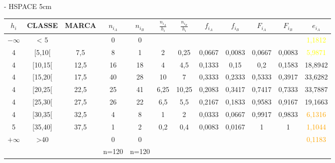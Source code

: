 \vspace{1cm}
\hspace*{5cm} - HSPACE 5cm
\newline
\vspace{1cm}
\newline
\begin{minipage}{.75\linewidth}
	\begin{tabular}{ |c|c|c|c|c|c|c|c|c|c|c|c| }
		\hline
		\rowcolor[gray]{0.7}
		$h_i$ & CLASSE & MARCA & $n_{i_A}$ & $n_{i_B}$ & $\frac{n_{i_A}}{h_i}$ & $\frac{n_{i_B}}{h_i}$ & $f_{i_A}$	& $f_{i_B}$ & $F_{i_A}$ & $F_{i_B}$ & $e_{i_A}$ \\
		\hline
		$-\infty$ & < 5 & & 0 & 0 & & & & & & & \textcolor{yellow}{1,1812} \\
		\hline
		4 & [5,10[ & 7,5 & 8 & 1 & 2 & 0,25 & 0,0667 & 0,0083 & 0,0667 & 0,0083 & \textcolor{yellow}{5,9871}\\
		\hline
		4 & [10,15[ & 12,5 & 16 & 18 & 4 & 4,5 & 0,1333 & 0,15 & 0,2 & 0,1583 & 18,8942\\
		\hline
		4 & [15,20[ & 17,5 & 40 & 28 & 10 & 7 & 0,3333 & 0,2333 & 0,5333 & 0,3917 & 33,6282\\
		\hline
		4 & [20,25[ & 22,5 & 25 & 41 & 6,25 & 10,25 & 0,2083 & 0,3417 & 0,7417 & 0,7333 & 33,7887\\
		\hline
		4 & [25,30[ & 27,5 & 26 & 22 & 6,5 & 5,5 & 0,2167 & 0,1833 & 0,9583 & 0,9167 & 19,1663\\
		\hline
		4 & [30,35[ & 32,5 & 4 & 8 & 1 & 2 & 0,0333 & 0,0667 & 0,9917 & 0,9833 & \textcolor{orange}{6,1316}\\
		\hline
		5 & [35,40] & 37,5 & 1 & 2 & 0,2 & 0,4 & 0,0083 & 0,0167 & 1 & 1 & \textcolor{orange}{1,1044}\\
		\hline
		$+\infty$ & >40 & & 0 & 0 & & & & & & & \textcolor{orange}{0,1183}\\
		\hline
		& & & n=120 & n=120 & & & & & & & \\
		\hline
	\end{tabular}
\end{minipage}
\vspace{1cm}
\newline
